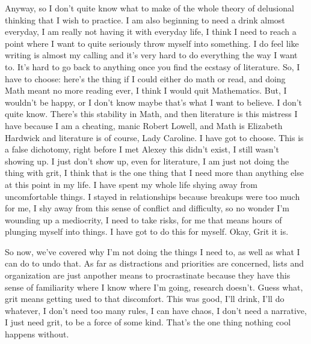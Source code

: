 Anyway, so I don't quite know what to make of the whole theory of delusional thinking that I wish to practice. I am also beginning to need a drink almost everyday, I am really not having it with everyday life, I think I need to reach a point where I want to quite seriously throw myself into something. I do feel like writing is almost my calling and it's very hard to do everything the way I want to. It's hard to go back to anything once you find the ecstasy of literature. So, I have to choose: here's the thing if I could either do math or read, and doing Math meant no more reading ever, I think I would quit Mathematics. But, I wouldn't be happy, or I don't know maybe that's what I want to believe. I don't quite know. There's this stability in Math, and then literature is this mistress I have because I am a cheating, manic Robert Lowell, and Math is Elizabeth Hardwick and literature is of course, Lady Caroline. I have got to choose. This is a false dichotomy, right before I met Alexey this didn't exist, I still wasn't showing up. I just don't show up, even for literature, I am just not doing the thing with grit, I think that is the one thing that I need more than anything else at this point in my life. I have spent my whole life shying away from uncomfortable things. I stayed in relationships because breakups were too much for me, I shy away from this sense of conflict and difficulty, so no wonder I'm wounding up a mediocrity, I need to take risks, for me that means hours of plunging myself into things. I have got to do this for myself. Okay, Grit it is.

So now, we've covered why I'm not doing the things I need to, as well as what I can do to undo that. As far as distractions and priorities are concerned, lists and organization are just anpother means to procrastinate because they have this sense of familiarity where I know where I'm going, research doesn't. Guess what, grit means getting used to that discomfort. This was good, I'll drink, I'll do whatever, I don't need too many rules, I can have chaos, I don't need a narrative, I just need grit, to be a force of some kind. That's the one thing nothing cool happens without. 